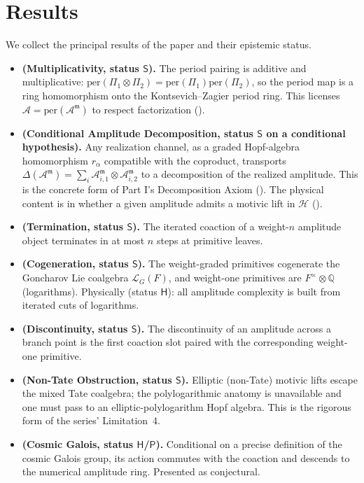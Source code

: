 \documentclass[12pt]{article}
\theoremstyle{definition}
\theoremstyle{remark}
\newcommand{\per}{\mathrm{per}}
\newcommand{\Am}{\mathcal{A}}
\newcommand{\Amm}{\mathcal{A}^{\mathfrak{m}}}
\newcommand{\LG}{\mathcal{L}_{G}}
\newcommand{\coA}{\Delta}
\newcommand{\Zmot}{\mathcal{H}}
\newcommand{\Qbb}{\mathbb{Q}}
\newcommand{\Slab}{\ensuremath{\mathsf{S}}}
\newcommand{\Hlab}{\ensuremath{\mathsf{H}}}
\newcommand{\Plab}{\ensuremath{\mathsf{P}}}
\begin{document}
\section{Results}
\label{sec:results}

We collect the principal results of the paper and their epistemic status.

\begin{itemize}[leftmargin=1.6em]
\item \textbf{ (Multiplicativity, status \Slab).} The period pairing is
additive and multiplicative: $\per(\Pi_1\otimes\Pi_2)=\per(\Pi_1)\per(\Pi_2)$, so the period
map is a ring homomorphism onto the Kontsevich--Zagier period ring. This licenses
$\Am=\per(\Amm)$ to respect factorization ().
\item \textbf{ (Conditional Amplitude Decomposition, status \Slab{} on a
conditional hypothesis).} Any realization channel, as a graded Hopf-algebra homomorphism
$r_\alpha$ compatible with the coproduct,
transports $\coA(\Amm)=\sum_i\Amm_{i,1}\otimes\Amm_{i,2}$ to a decomposition of the realized
amplitude. This is the concrete form of Part I's Decomposition Axiom (). The
physical content is in whether a given amplitude admits a motivic lift in $\Zmot$
().
\item \textbf{ (Termination, status \Slab).} The iterated coaction of a
weight-$n$ amplitude object terminates in at most $n$ steps at primitive leaves.
\item \textbf{ (Cogeneration, status \Slab).} The weight-graded
primitives cogenerate the Goncharov Lie coalgebra $\LG(F)$, and weight-one primitives are
$F^\times\otimes\Qbb$ (logarithms). Physically (status \Hlab): all amplitude complexity is
built from iterated cuts of logarithms.
\item \textbf{ (Discontinuity, status \Slab).} The discontinuity of an
amplitude across a branch point is the first coaction slot paired with the corresponding
weight-one primitive.
\item \textbf{ (Non-Tate Obstruction, status \Slab).} Elliptic (non-Tate)
motivic lifts escape the mixed Tate coalgebra; the polylogarithmic anatomy is unavailable and
one must pass to an elliptic-polylogarithm Hopf algebra. This is the rigorous form of the
series' Limitation~4.
\item \textbf{ (Cosmic Galois, status \Hlab/\Plab).} Conditional on a
precise definition of the cosmic Galois group, its action commutes with the coaction and
descends to the numerical amplitude ring. Presented as conjectural.
\end{itemize}
\end{document}
